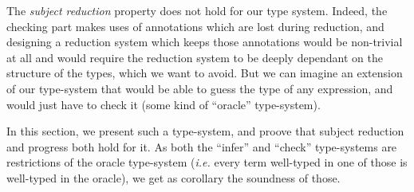 The \emph{subject reduction} property does not hold for our type system.
Indeed, the checking part makes uses of annotations which are lost during
reduction, and designing a reduction system which keeps those annotations would
be non-trivial at all and would require the reduction system to be deeply
dependant on the structure of the types, which we want to avoid.
But we can imagine an extension of our type-system that would be able to guess
the type of any expression, and would just have to check it (some kind of
``oracle'' type-system).

In this section, we present such a type-system, and proove that subject
reduction and progress both hold for it.
As both the ``infer'' and ``check'' type-systems are restrictions of the oracle
type-system (\emph{i.e.} every term well-typed in one of those is well-typed in
the oracle), we get as corollary the soundness of those.
